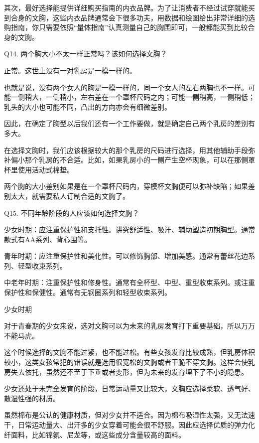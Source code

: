 \documentclass[12pt,UTF8]{ctexbook}
\begin{document}
其次，最好选择能提供详细购买指南的内衣品牌。为了让消费者不经过试穿就能买到合身的文胸，这些内衣品牌通常会下很多功夫，用数据和绘图给出非常详细的选购指南，你只需要依照“量体指南”认真测量自己的胸围即可，一般都能买到比较合身的文胸。





Q14. 两个胸大小不太一样正常吗？该如何选择文胸？


正常。这世上没有一对乳房是一模一样的。

也就是说，没有两个女人的胸是一模一样的，同一个女人的左右两胸也不一样。可能一侧稍大，一侧稍小，左右差在一个罩杯尺码之内；可能一侧稍高，一侧稍低；乳头的大小也可能不同，凸出的方向亦会有细微差别。

因此，在确定了胸型以后我们还有一个工作要做，就是确定自己两个乳房的差别有多大。

在选择文胸时，我们应该根据较大的那个乳房的尺码进行选择，用其他辅助手段弥补偏小那个乳房的不合适。比如，如果乳房小的一侧产生空杯现象，可以在那侧罩杯里使用活动式棉垫。

两个胸的大小差别如果是在一个罩杯尺码内，穿模杯文胸便可以弥补缺陷；如果差别太大，就需要私人订制合适的文胸了。





Q15. 不同年龄阶段的人应该如何选择文胸？


少女时期：应注重保护性和支托性。讲究舒适性、吸汗、辅助塑造初期胸型。通常款式有AA系列、背心围等。

青年时期：应注重保护性和美化性。可以修饰胸部、增加美感。通常有蕾丝花边系列、轻型收束系列。

中老年时期：注重保护性和修身性。通常有全杯型、中型、重型收束系列。或注重保护性和保健性。通常有无钢圈系列和轻型收束系列。

少女时期

对于青春期的少女来说，选对文胸可以为未来的乳房发育打下重要基础，所以万万不能马虎。

这个时候选择的文胸不能过紧，也不能过松。有些女孩发育比较成熟，但乳房体积较小，这类女孩常犯的错误就是选用很宽松的文胸或者干脆不穿文胸。这样会使乳房失去依托，虽然还不至于下垂或者变形，但为未来的发育埋下了不小的隐患。

少女还处于未完全发育的阶段，日常运动量又比较大，文胸应选择柔软、透气好、散湿性强的材质。

虽然棉布是公认的健康材质，但对少女并不适合。因为棉布吸湿性太强，又无法速干，日常运动量大、出汗多的少女穿着可能会很不舒服。因此应选择优质的弹力化纤面料，比如锦氨、尼龙等，或这些成分含量较高的面料。
\end{document}
